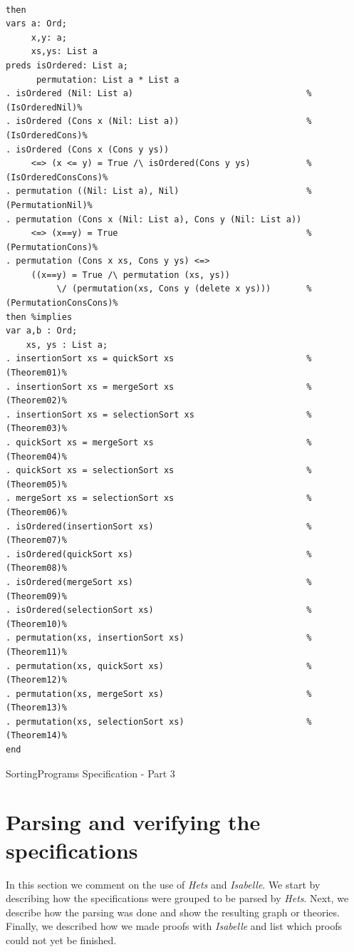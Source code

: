 \documentclass[12pt,twoside]{article}
\numberwithin{spec}{subsection}
\numberwithin{proof}{subsection}
\numberwithin{figure}{subsection}
\numberwithin{code}{subsection}
\begin{document}
\addtocounter{spec}{-1}
\begin{spec}
\begin{verbatim}

then
vars a: Ord;
     x,y: a;
     xs,ys: List a
preds isOrdered: List a;
      permutation: List a * List a
. isOrdered (Nil: List a)                                  %(IsOrderedNil)%
. isOrdered (Cons x (Nil: List a))                         %(IsOrderedCons)%
. isOrdered (Cons x (Cons y ys)) 
     <=> (x <= y) = True /\ isOrdered(Cons y ys)           %(IsOrderedConsCons)%
. permutation ((Nil: List a), Nil)                         %(PermutationNil)%
. permutation (Cons x (Nil: List a), Cons y (Nil: List a))
     <=> (x==y) = True                                     %(PermutationCons)%
. permutation (Cons x xs, Cons y ys) <=>
     ((x==y) = True /\ permutation (xs, ys)) 
          \/ (permutation(xs, Cons y (delete x ys)))       %(PermutationConsCons)%
then %implies
var a,b : Ord;
    xs, ys : List a;
. insertionSort xs = quickSort xs                          %(Theorem01)%
. insertionSort xs = mergeSort xs                          %(Theorem02)%
. insertionSort xs = selectionSort xs                      %(Theorem03)%
. quickSort xs = mergeSort xs                              %(Theorem04)%
. quickSort xs = selectionSort xs                          %(Theorem05)%
. mergeSort xs = selectionSort xs                          %(Theorem06)%
. isOrdered(insertionSort xs)                              %(Theorem07)%
. isOrdered(quickSort xs)                                  %(Theorem08)%
. isOrdered(mergeSort xs)                                  %(Theorem09)%
. isOrdered(selectionSort xs)                              %(Theorem10)%
. permutation(xs, insertionSort xs)                        %(Theorem11)%
. permutation(xs, quickSort xs)                            %(Theorem12)%
. permutation(xs, mergeSort xs)                            %(Theorem13)%
. permutation(xs, selectionSort xs)                        %(Theorem14)%
end
\end{verbatim}
\caption{SortingPrograms Specification - Part 3}
\label{spec:SortingPrograms}
\end{spec}

\clearpage

\section{Parsing and verifying the specifications}\label{Parsing}
In this section we comment on the use of \textit{Hets} and \textit{Isabelle}. We start by describing how the specifications were grouped to be parsed by \textit{Hets}. Next, we describe how the parsing was done and show the resulting graph or theories. Finally, we described how we made proofs with \textit{Isabelle} and list which proofs could not yet be finished.
\end{document}
